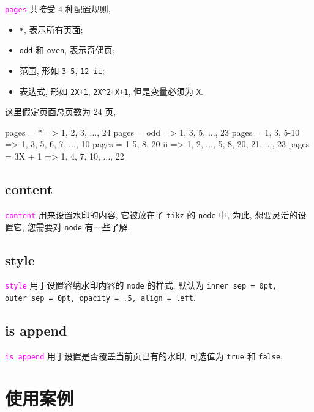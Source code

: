\documentclass{article}
\newcounter{example}
\def\opt#1{\textcolor{magenta}{\texttt{#1}}}
\def\para#1{\textcolor[rgb]{0.13, 0.67, 0.8}{\texttt{#1}}}
\begin{document}
\opt{pages} 共接受 4 种配置规则, 
\begin{itemize}
  \item \para{*}, 表示所有页面;
  \item \para{odd} 和 \para{oven}, 表示奇偶页;
  \item 范围, 形如 \para{3-5}, \para{12-ii};
  \item 表达式, 形如 \para{2X+1}, \para{2X\^{}2+X+1}, 但是变量必须为 \para{X}.
\end{itemize}

这里假定页面总页数为 24 页, 
\begin{example}[title = pages 配置规则]
pages = {*}              =>     1, 2, 3, ..., 24
pages = {odd}            =>     1, 3, 5, ..., 23
pages = {1, 3, 5-10}     =>     1, 3, 5, 6, 7, ..., 10
pages = {1-5, 8, 20-ii}  =>     1, 2, ..., 5, 8, 20, 21, ..., 23
pages = {3X + 1}         =>     1, 4, 7, 10, ..., 22
\end{example}

\subsection{content}
\opt{content} 用来设置水印的内容, 它被放在了 \texttt{tikz} 的 \texttt{node} 中, 为此, 想要灵活的设置它, 您需要对 \texttt{node} 有一些了解.

\subsection{style}
\opt{style} 用于设置容纳水印内容的 \texttt{node} 的样式, 默认为 \para{inner~sep = 0pt, outer~sep = 0pt, opacity = .5, align = left}.

\subsection{is append}
\opt{is append} 用于设置是否覆盖当前页已有的水印, 可选值为 \para{true} 和 \para{false}.

\section{使用案例}
\begin{example}[title = 为所有页面右上角添加页码]
\end{example}
\begin{example}[title = 为偶数页页面中心添加文字 Watermark]
\end{example}
\end{document}
